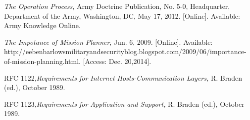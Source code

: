 \documentclass[conference]{IEEEtran}
\begin{document}
\begin{thebibliography}{1}

   {\em The Operation Process}, Army Doctrine Publication, No. 5-0, Headquarter, Department of the Army, Washington, DC, May 17, 2012. [Online]. Available: Army Knowledge Online.

   {\em The Impotance of Mission Planner}, Jun. 6, 2009. [Online]. Available: http://eebenbarlowsmilitaryandsecurityblog.blogspot.com/2009/06/importance-of-mission-planning.html. [Access: Dec. 20,2014].
  
   RFC 1122,{\em Requirements for Internet Hosts-Communication Layers,} R. Braden (ed.), October 1989.
  
   RFC 1123,{\em Requirements for Application and Support,} R. Braden (ed.), October 1989.
  
  
\end{thebibliography}
\end{document}
